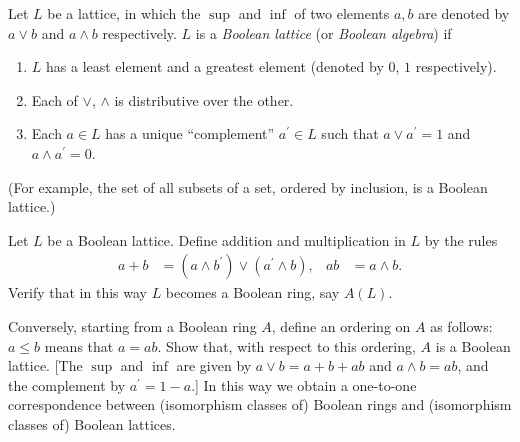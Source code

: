 \begin{exercise}
Let \(L\) be a lattice, in which the \(\sup\) and \(\inf\) of two elements \(a, b\) are denoted by \(a \vee b\) and \(a \wedge b\) respectively.
\(L\) is a \emph{Boolean lattice} (or \emph{Boolean algebra}) if
\begin{enumerate}[label={\roman*)}]
\item
\(L\) has a least element and a greatest element (denoted by \(0\), \(1\) respectively).
\item
Each of \(\vee\), \(\wedge\) is distributive over the other.
\item
Each \(a \in L\) has a unique ``complement'' \(a^\prime \in L\) such that \(a \vee a^\prime = 1\) and \(a \wedge a^\prime = 0\).
\end{enumerate}
(For example, the set of all subsets of a set, ordered by inclusion, is a Boolean lattice.)

Let \(L\) be a Boolean lattice.
Define addition and multiplication in \(L\) by the rules
\begin{align*}
a + b &= (a \wedge b^\prime) \vee (a^\prime \wedge b), &
a b &= a \wedge b.
\end{align*}
Verify that in this way \(L\) becomes a Boolean ring, say \(A(L)\).

Conversely, starting from a Boolean ring \(A\), define an ordering on \(A\) as follows:
\(a \leq b\) means that \(a = a b\).
Show that, with respect to this ordering, \(A\) is a Boolean lattice.
[The \(\sup\) and \(\inf\) are given by \(a \vee b = a + b + a b\) and \(a \wedge b = a b\), and the complement by \(a^\prime = 1 - a\).]
In this way we obtain a one-to-one correspondence between (isomorphism classes of) Boolean rings and (isomorphism classes of) Boolean lattices.
\end{exercise}